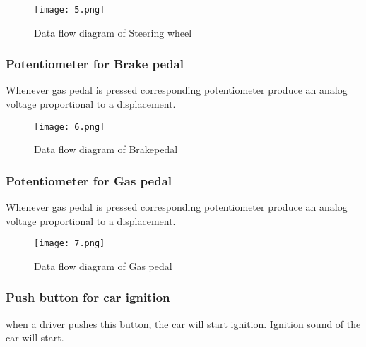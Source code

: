 \documentclass[12pt,a4paper]{article}
\begin{document}
\begin{center}
\begin{center}
\begin{center}
\begin{figure}[H]
	\centering 
	\texttt{[image: 5.png]}
	\caption{Data flow diagram of Steering wheel}	
\end{figure}
\subsubsection*{Potentiometer for Brake pedal}
Whenever gas pedal is pressed corresponding potentiometer produce an analog voltage proportional to a displacement.
\begin{figure}[H]
	\centering 
	\texttt{[image: 6.png]}
	\caption{Data flow diagram of Brakepedal}	
\end{figure}
\subsubsection*{Potentiometer for Gas pedal}
Whenever gas pedal is pressed corresponding potentiometer produce an analog voltage proportional to a displacement.
\begin{figure}[H]
	\centering 
	\texttt{[image: 7.png]}
	\caption{Data flow diagram of Gas pedal}	
\end{figure}
\newline

\subsubsection{Push button for car ignition}
when a driver pushes this button, the car will start ignition. Ignition sound of the car will start.

\end{center}
\end{center}
\end{center}
\end{document}
